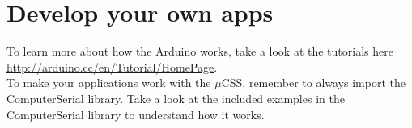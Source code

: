	\section{Develop your own apps}
	To learn more about how the Arduino works, take a look at the tutorials here \url{http://arduino.cc/en/Tutorial/HomePage}.\\
	
	To make your applications work with the $\mu$CSS, remember to always import the ComputerSerial library. Take a look at the included examples in the ComputerSerial library to understand how it works.